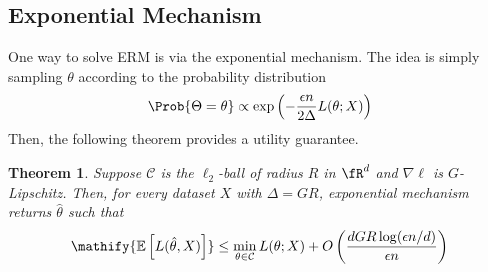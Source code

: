 \documentclass[11pt, a4paper]{article}
\newtheorem{theorem}{Theorem}
\newcommand{\E}[1]{\mathify{\mathbb{E}\left[#1\right]}}
\begin{document}
\subsection{Exponential Mechanism}
One way to solve ERM is via the exponential mechanism.
The idea is simply sampling $\theta$ according to the probability distribution
\begin{align}
    \Prob{\Theta=\theta}\propto \exp\left(-\frac{\epsilon n}{2\Delta}L(\theta; X)\right)
\end{align}
Then, the following theorem provides a utility guarantee.
\begin{theorem}
    Suppose $\mathcal{C}$ is the $\ell_2$-ball of radius $R$ in $\fR^d$ and $\nabla\ell$ is $G$-Lipschitz.
    Then, for every dataset $X$ with $\Delta=GR$, exponential mechanism returns $\hat{\theta}$ such that
    \begin{align}
        \E{L(\hat{\theta}, X)} \leq \min_{\theta\in \mathcal{C}} L(\theta; X) 
            + O\left(\frac{dGR\log(\epsilon n/d)}{\epsilon n}\right)
    \end{align}
\end{theorem}
\end{document}
